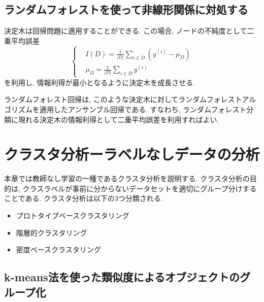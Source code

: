 \documentclass[uplatex]{jsarticle}
\theoremstyle{definition}
\numberwithin{equation}{section}
\begin{document}
\subsection{ランダムフォレストを使って非線形関係に対処する}
決定木は回帰問題に適用することができる.
この場合, ノードの不純度として二乗平均誤差
\begin{equation}
    \left\{
    \begin{aligned}
        &I(D) = \frac{1}{|D|}\sum_{i \in D} (y^{(i)} - \mu_{D}) \\
        &\mu_{D} = \frac{1}{|D|}\sum_{i \in D} y^{(i)}
    \end{aligned}
    \right.
\end{equation}
を利用し, 情報利得が最小となるように決定木を成長させる.

ランダムフォレスト回帰は, このような決定木に対してランダムフォレストアルゴリズムを適用したアンサンブル回帰である.
すなわち, ランダムフォレスト分類に現れる決定木の情報利得として二乗平均誤差を利用すればよい.


\section{クラスタ分析ーラベルなしデータの分析}
本章では教師なし学習の一種であるクラスタ分析を説明する.
クラスタ分析の目的は, クラスラベルが事前に分からないデータセットを適切にグループ分けすることである.
クラスタ分析は以下の3つ分類される.
\begin{itemize}
    \item
    プロトタイプベースクラスタリング
    \item
    階層的クラスタリング
    \item
    密度ベースクラスタリング
\end{itemize}

\subsection{k-means法を使った類似度によるオブジェクトのグループ化}
\end{document}
